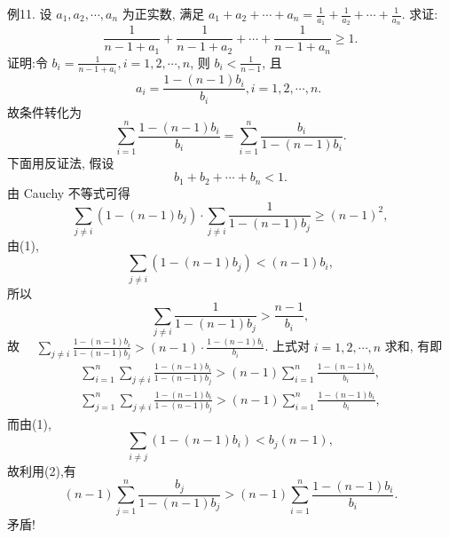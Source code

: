 例11. 设 $a_1, a_2, \cdots, a_n$ 为正实数, 满足 $a_1+a_2+\cdots+a_n=\frac{1}{a_1}+ \frac{1}{a_2}+\cdots+\frac{1}{a_n}$. 求证:
$$
\frac{1}{n-1+a_1}+\frac{1}{n-1+a_2}+\cdots+\frac{1}{n-1+a_n} \geqslant 1 .
$$
证明:令 $b_i=\frac{1}{n-1+a_i}, i=1,2, \cdots, n$, 则 $b_i<\frac{1}{n-1}$, 且
$$
a_i=\frac{1-(n-1) b_i}{b_i}, i=1,2, \cdots, n \text {. }
$$
故条件转化为
$$
\sum_{i=1}^n \frac{1-(n-1) b_i}{b_i}=\sum_{i=1}^n \frac{b_i}{1-(n-1) b_i} .
$$
下面用反证法, 假设
$$
b_1+b_2+\cdots+b_n<1 . \label{(1)}
$$
由 Cauchy 不等式可得
$$
\sum_{j \neq i}\left(1-(n-1) b_j\right) \cdot \sum_{j \neq i} \frac{1}{1-(n-1) b_j} \geqslant(n-1)^2,
$$
由(1),
$$
\sum_{j \neq i}\left(1-(n-1) b_j\right)<(n-1) b_i,
$$
所以
$$
\sum_{j \neq i} \frac{1}{1-(n-1) b_j}>\frac{n-1}{b_i},
$$
故 $\quad \sum_{j \neq i} \frac{1-(n-1) b_i}{1-(n-1) b_j}>(n-1) \cdot \frac{1-(n-1) b_i}{b_i}$.
上式对 $i=1,2, \cdots, n$ 求和, 有即
$$
\begin{gathered}
\sum_{i=1}^n \sum_{j \neq i} \frac{1-(n-1) b_i}{1-(n-1) b_j}>(n-1) \sum_{i=1}^n \frac{1-(n-1) b_i}{b_i}, \\
\sum_{j=1}^n \sum_{j \neq i} \frac{1-(n-1) b_i}{1-(n-1) b_j}>(n-1) \sum_{i=1}^n \frac{1-(n-1) b_i}{b_i}, \label{(2)}
\end{gathered}
$$
而由(1),
$$
\sum_{i \neq j}\left(1-(n-1) b_i\right)<b_j(n-1),
$$
故利用(2),有
$$
(n-1) \sum_{j=1}^n \frac{b_j}{1-(n-1) b_j}>(n-1) \sum_{i=1}^n \frac{1-(n-1) b_i}{b_i} .
$$
矛盾!



